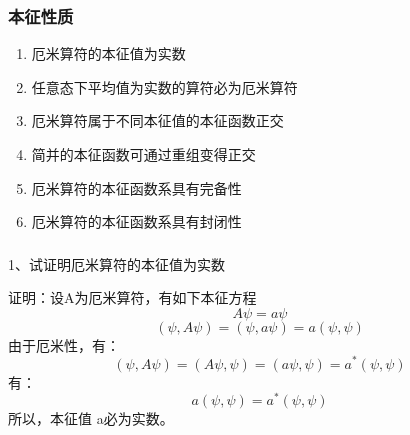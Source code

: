\begin{frame}
    \frametitle{本征性质}
    \begin{enumerate}
        \item 厄米算符的本征值为实数
        \item 任意态下平均值为实数的算符必为厄米算符
        \item 厄米算符属于不同本征值的本征函数正交
        \item 简并的本征函数可通过重组变得正交
        \item 厄米算符的本征函数系具有完备性
        \item 厄米算符的本征函数系具有封闭性
    \end{enumerate}
\end{frame} 
\begin{frame} [allowframebreaks=]
    \frametitle{}
    \begin{exampleblock}{}
        1、试证明厄米算符的本征值为实数
    \end{exampleblock}
    \alert{证明：}设A为厄米算符，有如下本征方程
    $$A\psi=a\psi $$
    \begin{equation*}
        (\psi, A\psi)=(\psi, a\psi)=a(\psi, \psi)
    \end{equation*}  
    由于厄米性，有：
    \begin{equation*}
        (\psi, A\psi)=(A\psi, \psi)=(a\psi, \psi)= a^* (\psi, \psi)
    \end{equation*}
    有：
    \begin{equation*}
        a(\psi, \psi)= a^* (\psi, \psi)
    \end{equation*}
    所以，本征值 a必为实数。
\end{frame} 

